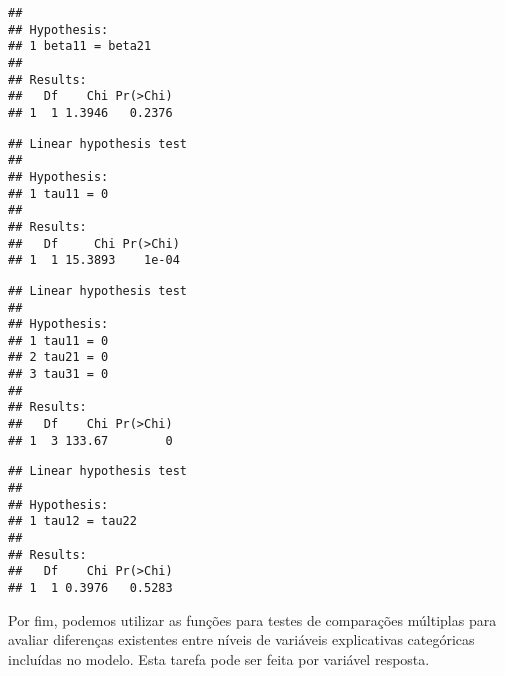 \begin{knitrout}
\begin{kframe}
\begin{verbatim}
## 
## Hypothesis:                 
## 1 beta11 = beta21
## 
## Results:
##   Df    Chi Pr(>Chi)
## 1  1 1.3946   0.2376
\end{verbatim}
\begin{alltt}
\hlstd{(} 
                      \hlstd{=} \hlstd{(}\hlstd{))}
\end{alltt}
\begin{verbatim}
## Linear hypothesis test
## 
## Hypothesis:           
## 1 tau11 = 0
## 
## Results:
##   Df     Chi Pr(>Chi)
## 1  1 15.3893    1e-04
\end{verbatim}
\begin{alltt}
\hlstd{(} 
                      \hlstd{=} \hlstd{(}\hlstd{,}
                                    \hlstd{,}
                                    \hlstd{))}
\end{alltt}
\begin{verbatim}
## Linear hypothesis test
## 
## Hypothesis:           
## 1 tau11 = 0
## 2 tau21 = 0
## 3 tau31 = 0
## 
## Results:
##   Df    Chi Pr(>Chi)
## 1  3 133.67        0
\end{verbatim}
\begin{alltt}
\hlstd{(} 
                      \hlstd{=} \hlstd{(}\hlstd{))}
\end{alltt}
\begin{verbatim}
## Linear hypothesis test
## 
## Hypothesis:               
## 1 tau12 = tau22
## 
## Results:
##   Df    Chi Pr(>Chi)
## 1  1 0.3976   0.5283
\end{verbatim}
\end{kframe}
\end{knitrout}

Por fim, podemos utilizar as funções para testes de comparações múltiplas para avaliar diferenças existentes entre níveis de variáveis explicativas categóricas incluídas no modelo. Esta tarefa pode ser feita por variável resposta.


